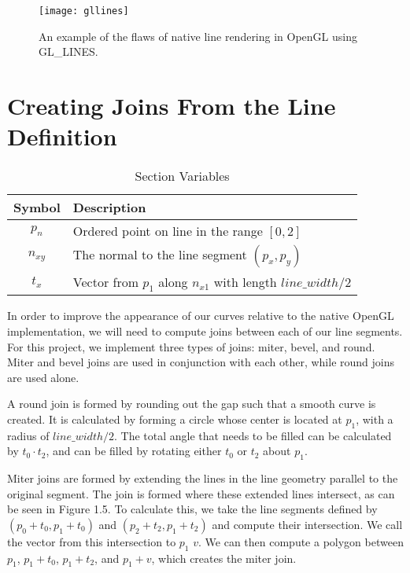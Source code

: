 \begin{figure}
\texttt{[image: gllines]}
\caption{An example of the flaws of native line rendering in OpenGL using GL\_LINES.}
\end{figure}

\pagebreak
\section{Creating Joins From the Line Definition}

\begin{table}
\begin{center}
\begin{tabular}{|c|l|}
\hline
\textbf{Symbol} & \textbf{Description} \\ \hline
$p_n$			& Ordered point on line in the range $[0,2]$ \\
$n_{xy}$		& The normal to the line segment $(p_x, p_y)$ \\	
$t_x$			& Vector from $p_1$ along $n_{x1}$ with length $line\_width/2$ \\
\hline
\end{tabular}
\caption{Section Variables} \label{tab:linevariables}
\end{center}
\end{table}

In order to improve the appearance of our curves relative to the native OpenGL implementation, we will need to compute joins between each of our line segments.
For this project, we implement three types of joins: miter, bevel, and round.
Miter and bevel joins are used in conjunction with each other, while round joins are used alone.

A round join is formed by rounding out the gap such that a smooth curve is created. 
It is calculated by forming a circle whose center is located at $p_1$, with a radius of $line\_width/2$. 
The total angle that needs to be filled can be calculated by $t_0 \cdot t_2$, and can be filled by rotating either $t_0$ or $t_2$ about $p_1$.

Miter joins are formed by extending the lines in the line geometry parallel to the original segment.
The join is formed where these extended lines intersect, as can be seen in Figure 1.5.
To calculate this, we take the line segments defined by $(p_0 + t_0, p_1 + t_0)$ and $(p_2 + t_2, p_1 + t_2)$ and compute their intersection. We call the vector from this intersection to $p_1$ $v$.
We can then compute a polygon between $p_1$, $p_1 + t_0$, $p_1 + t_2$, and $p_1 + v$, which creates the miter join. 

